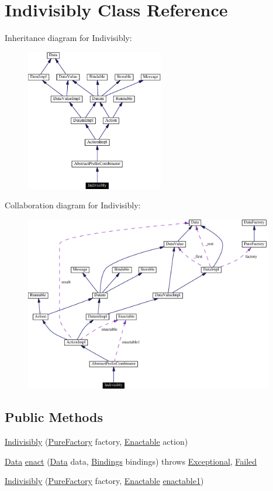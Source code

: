 \hypertarget{classIndivisibly}{
\section{Indivisibly  Class Reference}
\label{classIndivisibly}
}
Inheritance diagram for Indivisibly:\begin{figure}[H]
\begin{center}
\leavevmode
\includegraphics[width=170pt]{classIndivisibly__inherit__graph}
\end{center}
\end{figure}
Collaboration diagram for Indivisibly:\begin{figure}[H]
\begin{center}
\leavevmode
\includegraphics[width=308pt]{classIndivisibly__coll__graph}
\end{center}
\end{figure}
\subsection*{Public Methods}
\begin{CompactItemize}
\item 
\hyperlink{classIndivisibly_a0}{Indivisibly} (\hyperlink{classPureFactory}{Pure\-Factory} factory, \hyperlink{interfaceEnactable}{Enactable} action)
\item 
\hyperlink{interfaceData}{Data} \hyperlink{classIndivisibly_a1}{enact} (\hyperlink{interfaceData}{Data} data, \hyperlink{interfaceBindings}{Bindings} bindings) throws \hyperlink{classExceptional}{Exceptional}, \hyperlink{classFailed}{Failed}
\item 
\hyperlink{classIndivisibly_a2}{Indivisibly} (\hyperlink{classPureFactory}{Pure\-Factory} factory, \hyperlink{interfaceEnactable}{Enactable} \hyperlink{classAbstractPrefixCombinator_n0}{enactable1})
\end{CompactItemize}


